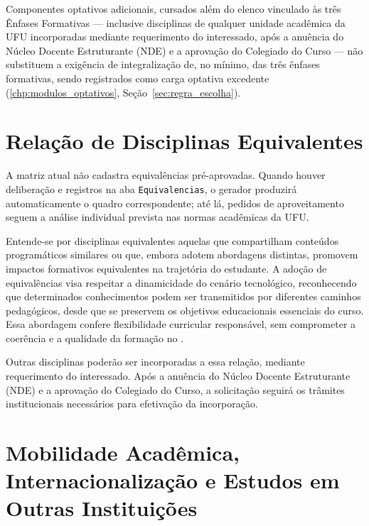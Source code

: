 

Componentes optativos adicionais, cursados além do elenco vinculado às três Ênfases Formativas — inclusive disciplinas de qualquer unidade acadêmica da UFU incorporadas mediante requerimento do interessado, após a anuência do Núcleo Docente Estruturante (NDE) e a aprovação do Colegiado do Curso — não substituem a exigência de integralização de, no mínimo,  das três ênfases formativas, sendo registrados como carga optativa excedente (\autoref{chp:modulos_optativos}, Seção~\ref{sec:regra_escolha}).

\section{Relação de Disciplinas Equivalentes}
\label{sec:equivalentes}

A matriz atual não cadastra equivalências pré-aprovadas. Quando houver deliberação e registros na aba \texttt{Equivalencias}, o gerador produzirá automaticamente o quadro correspondente; até lá, pedidos de aproveitamento seguem a análise individual prevista nas normas acadêmicas da UFU.

Entende-se por disciplinas equivalentes aquelas que compartilham conteúdos programáticos similares ou que, embora adotem abordagens distintas, promovem impactos formativos equivalentes na trajetória do estudante. A adoção de equivalências visa respeitar a dinamicidade do cenário tecnológico, reconhecendo que determinados conhecimentos podem ser transmitidos por diferentes caminhos pedagógicos, desde que se preservem os objetivos educacionais essenciais do curso. Essa abordagem confere flexibilidade curricular responsável, sem comprometer a coerência e a qualidade da formação no \ppccurso.


Outras disciplinas poderão ser incorporadas a essa relação, mediante requerimento do interessado. Após a anuência do Núcleo Docente Estruturante (NDE) e a aprovação do Colegiado do Curso, a solicitação seguirá os trâmites institucionais necessários para efetivação da incorporação.

\section{Mobilidade Acadêmica, Internacionalização e Estudos em Outras Instituições}
\label{sec:mobilidade}


